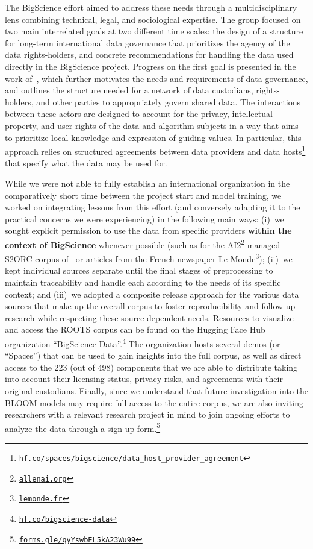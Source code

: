 \documentclass[twoside,11pt]{article}
\begin{document}
The BigScience effort aimed to address these needs through a multidisciplinary lens combining technical, legal, and sociological expertise.
The group focused on two main interrelated goals at two different time scales: the design of a structure for long-term international data governance that prioritizes the agency of the data rights-holders, and concrete recommendations for handling the data used directly in the BigScience project.
Progress on the first goal is presented in the work of~\citet{jernite2022data}, which further motivates the needs and requirements of data governance, and outlines the structure needed for a network of data custodians, rights-holders, and other parties to appropriately govern shared data.
The interactions between these actors are designed to account for the privacy, intellectual property, and user rights of the data and algorithm subjects in a way that aims to prioritize local knowledge and expression of guiding values.
In particular, this approach relies on structured agreements between data providers and data hosts\footnote{\href{https://hf.co/spaces/bigscience/data_host_provider_agreement}{\texttt{hf.co/spaces/bigscience/data\_host\_provider\_agreement}}} that specify what the data may be used for.

While we were not able to fully establish an international organization in the comparatively short time between the project start and model training, we worked on integrating lessons from this effort (and conversely adapting it to the practical concerns we were experiencing) in the following main ways: (i)~we sought explicit permission to use the data from specific providers \textbf{within the context of BigScience} whenever possible (such as for the AI2\footnote{\href{https://allenai.org/}{\texttt{allenai.org}}}-managed S2ORC corpus of~\citet{lo2020s2orc} or articles from the French newspaper Le Monde\footnote{\href{https://www.lemonde.fr/}{\texttt{lemonde.fr}}}); (ii)~we kept individual sources separate until the final stages of preprocessing to maintain traceability and handle each according to the needs of its specific context; and (iii)~we adopted a composite release approach for the various data sources that make up the overall corpus to foster reproducibility and follow-up research while respecting these source-dependent needs.
%
Resources to visualize and access the ROOTS corpus can be found on the Hugging Face Hub organization ``BigScience Data''.\footnote{\href{https://hf.co/bigscience-data}{\texttt{hf.co/bigscience-data}}} The organization hosts several demos (or ``Spaces'') that can be used to gain insights into the full corpus, as well as direct access to the 223 (out of 498) components that we are able to distribute taking into account their licensing status, privacy risks, and agreements with their original custodians. Finally, since we understand that future investigation into the BLOOM models may require full access to the entire corpus, we are also inviting researchers with a relevant research project in mind to join ongoing efforts to analyze the data through a sign-up form.\footnote{\href{https://forms.gle/qyYswbEL5kA23Wu99}{{\texttt{forms.gle/qyYswbEL5kA23Wu99}}}}
\end{document}

